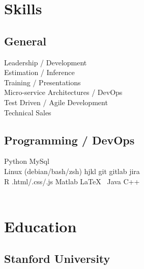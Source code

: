 \documentclass[letterpaper]{deedy-resume} %
\begin{document}
\begin{minipage}[t]{0.33\textwidth} %


\section{Skills}

\subsection{General}

Leadership / Development\\
Estimation / Inference\\
Training / Presentations\\
Micro-service Architectures / DevOps\\
Test Driven / Agile Development\\
Technical Sales\\

\sectionspace %

\subsection{Programming / DevOps}

\textbullet{} Python \textbullet{} MySql\\ 
\textbullet{} Linux (debian/bash/zsh) \textbullet{} hjkl
\textbullet{} git \textbullet{} gitlab \textbullet{} jira\\
\textbullet{} R \textbullet{} .html/.css/.js \textbullet{} Matlab \textbullet{} \LaTeX\ \textbullet{} Java \textbullet{} C++\\
\\

\sectionspace %



\section{Education}

\subsection{Stanford University}


\end{minipage}
\end{document}
